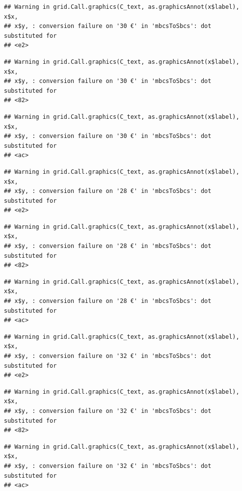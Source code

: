 \documentclass[]{gitbook}
\begin{document}
\begin{verbatim}
## Warning in grid.Call.graphics(C_text, as.graphicsAnnot(x$label), x$x,
## x$y, : conversion failure on '30 €' in 'mbcsToSbcs': dot substituted for
## <e2>
\end{verbatim}

\begin{verbatim}
## Warning in grid.Call.graphics(C_text, as.graphicsAnnot(x$label), x$x,
## x$y, : conversion failure on '30 €' in 'mbcsToSbcs': dot substituted for
## <82>
\end{verbatim}

\begin{verbatim}
## Warning in grid.Call.graphics(C_text, as.graphicsAnnot(x$label), x$x,
## x$y, : conversion failure on '30 €' in 'mbcsToSbcs': dot substituted for
## <ac>
\end{verbatim}

\begin{verbatim}
## Warning in grid.Call.graphics(C_text, as.graphicsAnnot(x$label), x$x,
## x$y, : conversion failure on '28 €' in 'mbcsToSbcs': dot substituted for
## <e2>
\end{verbatim}

\begin{verbatim}
## Warning in grid.Call.graphics(C_text, as.graphicsAnnot(x$label), x$x,
## x$y, : conversion failure on '28 €' in 'mbcsToSbcs': dot substituted for
## <82>
\end{verbatim}

\begin{verbatim}
## Warning in grid.Call.graphics(C_text, as.graphicsAnnot(x$label), x$x,
## x$y, : conversion failure on '28 €' in 'mbcsToSbcs': dot substituted for
## <ac>
\end{verbatim}

\begin{verbatim}
## Warning in grid.Call.graphics(C_text, as.graphicsAnnot(x$label), x$x,
## x$y, : conversion failure on '32 €' in 'mbcsToSbcs': dot substituted for
## <e2>
\end{verbatim}

\begin{verbatim}
## Warning in grid.Call.graphics(C_text, as.graphicsAnnot(x$label), x$x,
## x$y, : conversion failure on '32 €' in 'mbcsToSbcs': dot substituted for
## <82>
\end{verbatim}

\begin{verbatim}
## Warning in grid.Call.graphics(C_text, as.graphicsAnnot(x$label), x$x,
## x$y, : conversion failure on '32 €' in 'mbcsToSbcs': dot substituted for
## <ac>
\end{verbatim}
\end{document}
